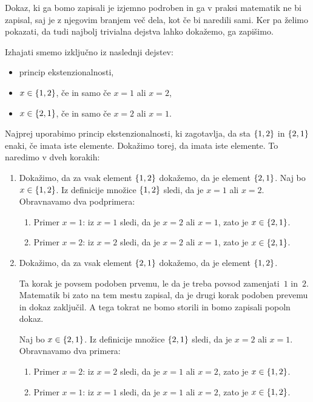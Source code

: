 \begin{dokaz}
  Dokaz, ki ga bomo zapisali je izjemno podroben in ga v praksi matematik ne bi zapisal,
  saj je z njegovim branjem več dela, kot če bi naredili sami. Ker pa želimo pokazati, da
  tudi najbolj trivialna dejstva lahko dokažemo, ga zapišimo.

  Izhajati smemo izključno iz naslednji dejstev:
  \begin{itemize}
  \item princip ekstenzionalnosti,
  \item $x \in \set{1, 2}$, če in samo če $x = 1$ ali $x = 2$,
  \item $x \in \set{2, 1}$, če in samo če $x = 2$ ali $x = 1$.
  \end{itemize}
  Najprej uporabimo princip ekstenzionalnosti, ki zagotavlja, da sta $\set{1, 2}$ in
  $\set{2, 1}$ enaki, če imata iste elemente. Dokažimo torej, da imata iste elemente. To
  naredimo v dveh korakih:
  \begin{enumerate}
  \item Dokažimo, da za vsak element $\set{1, 2}$ dokažemo, da je element $\set{2, 1}$.
    Naj bo $x \in \set{1, 2}$. Iz definicije množice $\set{1, 2}$
    sledi, da je $x = 1$ ali $x = 2$. Obravnavamo dva podprimera:
    \begin{enumerate}
    \item Primer $x = 1$: iz $x = 1$ sledi, da je $x = 2$ ali $x = 1$, zato je $x \in \set{2, 1}$.
    \item Primer $x = 2$: iz $x = 2$ sledi, da je $x = 2$ ali $x = 1$, zato je $x \in \set{2, 1}$.
    \end{enumerate}
  \item Dokažimo, da za vsak element $\set{2, 1}$ dokažemo, da je element $\set{1, 2}$.

    Ta korak je povsem podoben prvemu, le da je treba povsod zamenjati~$1$ in~$2$.
    Matematik bi zato na tem mestu zapisal, da je drugi korak podoben prevemu in dokaz
    zaključil. A tega tokrat ne bomo storili in bomo zapisali popoln dokaz.

    Naj bo $x \in \set{2, 1}$. Iz definicije množice $\set{2, 1}$ sledi, da je $x = 2$ ali
    $x = 1$. Obravnavamo dva primera:
    \begin{enumerate}
    \item Primer $x = 2$: iz $x = 2$ sledi, da je $x = 1$ ali $x = 2$, zato je $x \in \set{1, 2}$.
    \item Primer $x = 1$: iz $x = 1$ sledi, da je $x = 1$ ali $x = 2$, zato je $x \in \set{1, 2}$. \qedhere
    \end{enumerate}
  \end{enumerate}
\end{dokaz}

